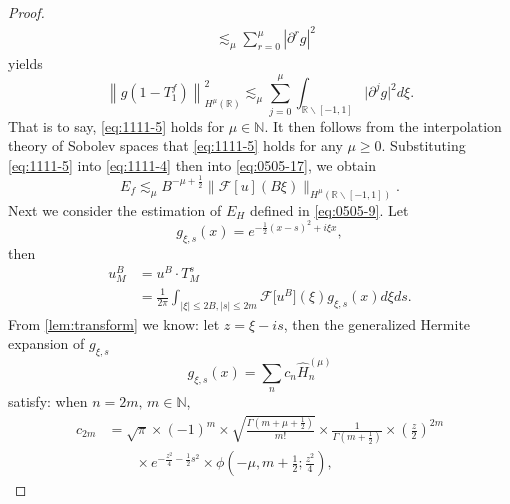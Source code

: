 \documentclass[10pt,a4paper]{amsart}
\begin{document}
\begin{proof}
\begin{equation}
\begin{aligned}
    & \lesssim_\mu \sum_{r=0}^\mu\left|\partial^r g\right|^2
    \end{aligned}
  \end{equation}
  yields
  \begin{equation}\label{eq:1111-8}
    \left\|g\left(1-T_1^f\right)\right\|_{H^\mu(\mathbb{R})}^2 \lesssim_\mu \sum_{j=0}^\mu \int_{\mathbb{R} \backslash[-1,1]}\bigl|\partial^j g\bigr|^2 d \xi.
  \end{equation}
  That is to say, \eqref{eq:1111-5} holds for $\mu \in \mathbb{N}$.
  It then follows from the interpolation theory of Sobolev spaces that \eqref{eq:1111-5} holds for any $\mu \geqslant 0$.
  Substituting \eqref{eq:1111-5} into \eqref{eq:1111-4} then into \eqref{eq:0505-17}, we obtain
  \begin{equation}\label{eq:1111-9}
    E_f \lesssim_\mu B^{-\mu+\frac{1}{2}} \bigl\|\mathcal{F}[u](B \xi)\bigr\|_{H^{\mu}\left(\mathbb{R}\backslash [-1,1]\right)}.
  \end{equation}
  Next we consider the estimation of $E_H$ defined in \eqref{eq:0505-9}.
  Let
  \begin{equation}\label{eq:0505-33}
    g_{\xi, s}(x)=e^{-\frac{1}{2}(x-s)^2+i \xi x},
  \end{equation}
  then
  \begin{equation}\label{eq:0505-34}
    \begin{aligned}
    u_M^B & =u^B \cdot T_M^s \\
    & =\frac{1}{2 \pi} \int_{|\xi| \leqslant 2 B,|s| \leqslant 2 m} \mathcal{F}\bigl[u^B\bigr](\xi) g_{\xi, s}(x) d \xi d s.
    \end{aligned}
  \end{equation}
  From \ref{lem:transform} we know:
  let $z = \xi - is$, then the generalized Hermite expansion of $g_{\xi,s}$
  \begin{equation}\label{eq:0505-35}
    g_{\xi, s}(x)=\sum_n c_n \widehat{H}_n^{(\mu)}
  \end{equation}
  satisfy: when $n = 2m,\, m \in \mathbb{N}$,
  \begin{equation}\label{eq:0505-36}
    \begin{aligned}
    c_{2 m} & =\sqrt{\pi} \times(-1)^m \times \sqrt{\frac{\Gamma\left(m+\mu+\frac{1}{2}\right)}{m!}} \times \frac{1}{\Gamma\left(m+\frac{1}{2}\right)} \times\left(\frac{z}{2}\right)^{2 m} \\
    &{}\qquad \times e^{-\frac{z^2}{4}-\frac{1}{2} s^2} \times \phi\left(-\mu, m+\frac{1}{2} ; \frac{z^2}{4}\right),
    \end{aligned}

\end{equation}
\end{proof}
\end{document}
